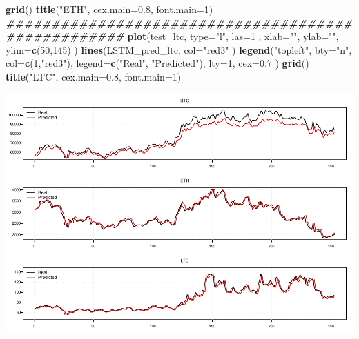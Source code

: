 \documentclass[
]{article}
\newenvironment{Shaded}{\begin{snugshade}}{\end{snugshade}}
\newcommand{\AttributeTok}[1]{\textcolor[rgb]{0.13,0.29,0.53}{#1}}
\newcommand{\DecValTok}[1]{\textcolor[rgb]{0.00,0.00,0.81}{#1}}
\newcommand{\DocumentationTok}[1]{\textcolor[rgb]{0.56,0.35,0.01}{\textbf{\textit{#1}}}}
\newcommand{\FloatTok}[1]{\textcolor[rgb]{0.00,0.00,0.81}{#1}}
\newcommand{\FunctionTok}[1]{\textcolor[rgb]{0.13,0.29,0.53}{\textbf{#1}}}
\newcommand{\NormalTok}[1]{#1}
\newcommand{\StringTok}[1]{\textcolor[rgb]{0.31,0.60,0.02}{#1}}
\begin{document}
\begin{Shaded}
\begin{Highlighting}[]
\FunctionTok{grid}\NormalTok{()}
\FunctionTok{title}\NormalTok{(}\StringTok{"ETH"}\NormalTok{, }\AttributeTok{cex.main=}\FloatTok{0.8}\NormalTok{, }\AttributeTok{font.main=}\DecValTok{1}\NormalTok{)}
\DocumentationTok{\#\#\#\#\#\#\#\#\#\#\#\#\#\#\#\#\#\#\#\#\#\#\#\#\#\#\#\#\#\#\#\#\#\#\#\#\#\#\#\#\#\#\#\#\#\#\#\#\#\#\#}
\FunctionTok{plot}\NormalTok{(test\_ltc, }\AttributeTok{type=}\StringTok{"l"}\NormalTok{, }\AttributeTok{las=}\DecValTok{1}\NormalTok{ , }\AttributeTok{xlab=}\StringTok{""}\NormalTok{, }\AttributeTok{ylab=}\StringTok{""}\NormalTok{, }\AttributeTok{ylim=}\FunctionTok{c}\NormalTok{(}\DecValTok{50}\NormalTok{,}\DecValTok{145}\NormalTok{) )}
\FunctionTok{lines}\NormalTok{(LSTM\_pred\_ltc, }\AttributeTok{col=}\StringTok{"red3"}\NormalTok{ )}
\FunctionTok{legend}\NormalTok{(}\StringTok{"topleft"}\NormalTok{, }\AttributeTok{bty=}\StringTok{"n"}\NormalTok{, }\AttributeTok{col=}\FunctionTok{c}\NormalTok{(}\DecValTok{1}\NormalTok{,}\StringTok{"red3"}\NormalTok{), }\AttributeTok{legend=}\FunctionTok{c}\NormalTok{(}\StringTok{"Real"}\NormalTok{, }\StringTok{"Predicted"}\NormalTok{), }\AttributeTok{lty=}\DecValTok{1}\NormalTok{, }\AttributeTok{cex=}\FloatTok{0.7}\NormalTok{ )}
\FunctionTok{grid}\NormalTok{()}
\FunctionTok{title}\NormalTok{(}\StringTok{"LTC"}\NormalTok{, }\AttributeTok{cex.main=}\FloatTok{0.8}\NormalTok{, }\AttributeTok{font.main=}\DecValTok{1}\NormalTok{)}
\end{Highlighting}
\end{Shaded}

\includegraphics{SoftwareCode_files/figure-latex/unnamed-chunk-18-1.pdf}
\end{document}
